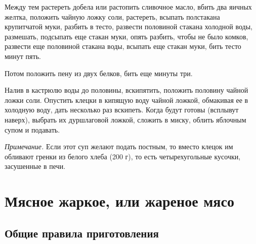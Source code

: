 Между тем растереть добела или растопить сливочное масло, вбить два яичных желтка, положить чайную ложку соли, растереть, всыпать полстакана крупитчатой муки, разбить в тесто, развести половиной стакана холодной воды, размешать, подсыпать еще стакан муки, опять разбить, чтобы не было комков, развести еще половиной стакана воды, всыпать еще стакан муки, бить тесто минут пять.

Потом положить пену из двух белков, бить еще минуты три.

Налив в кастрюлю воды до половины, вскипятить, положить половину чайной ложки соли. Опустить клецки в кипящую воду чайной ложкой, обмакивая ее в холодную воду, дать несколько раз вскипеть. Когда будут готовы (всплывут наверх), выбрать их дуршлаговой ложкой, сложить в миску, облить яблочным супом и подавать.

\emph{Примечание.} Если этот суп желают подать постным, то вместо клецок им обливают гренки из белого хлеба (200 г), то есть четырехугольные кусочки, засушенные в печи.

\newpage
\section{Мясное жаркое, или жареное мясо}

\subsection*{Общие правила приготовления} \label{3sec:obschie-zharkoje}

